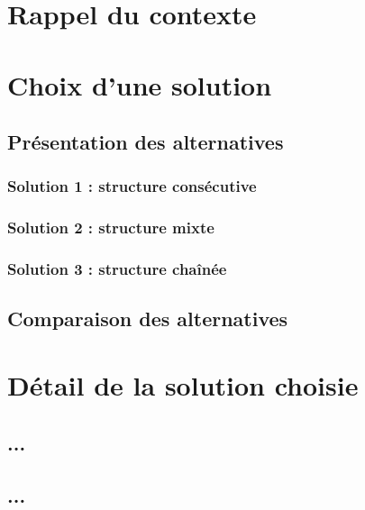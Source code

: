 
\section{Rappel du contexte}


\section{Choix d'une solution}
\subsection{Présentation des alternatives}

\subsubsection{Solution 1 : structure consécutive}

\subsubsection{Solution 2 : structure mixte}

\subsubsection{Solution 3 : structure chaînée}

\subsection{Comparaison des alternatives}



\section{Détail de la solution choisie}

\subsection{...}

\subsection{...}

